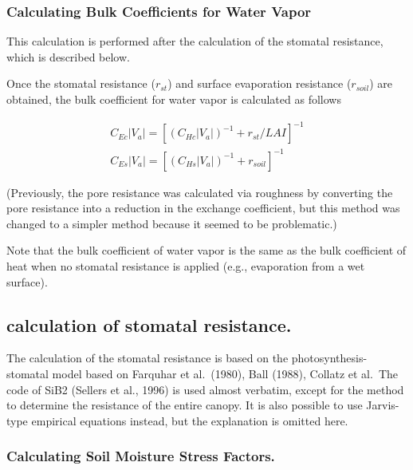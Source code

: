 \hypertarget{calculating-bulk-coefficients-for-water-vapor}{%
\subsubsection{Calculating Bulk Coefficients for Water
Vapor}\label{calculating-bulk-coefficients-for-water-vapor}}

This calculation is performed after the calculation of the stomatal
resistance, which is described below.

Once the stomatal resistance (\(r_{st}\)) and surface evaporation
resistance (\(r_{soil}\)) are obtained, the bulk coefficient for water
vapor is calculated as follows

\begin{eqnarray}
 C_{Ec} |V_a| = \left[ (C_{Hc} |V_a|)^{-1} + r_{st} / LAI\right]^{-1} \\
 C_{Es} |V_a| = \left[ (C_{Hs} |V_a|)^{-1} + r_{soil}\right]^{-1}
\end{eqnarray}

(Previously, the pore resistance was calculated via roughness by
converting the pore resistance into a reduction in the exchange
coefficient, but this method was changed to a simpler method because it
seemed to be problematic.)

Note that the bulk coefficient of water vapor is the same as the bulk
coefficient of heat when no stomatal resistance is applied (e.g.,
evaporation from a wet surface).

\hypertarget{calculation-of-stomatal-resistance.}{%
\subsection{calculation of stomatal
resistance.}\label{calculation-of-stomatal-resistance.}}

The calculation of the stomatal resistance is based on the
photosynthesis-stomatal model based on Farquhar et al.~(1980), Ball
(1988), Collatz et al.~The code of SiB2 (Sellers et al., 1996) is used
almost verbatim, except for the method to determine the resistance of
the entire canopy. It is also possible to use Jarvis-type empirical
equations instead, but the explanation is omitted here.

\hypertarget{calculating-soil-moisture-stress-factors.}{%
\subsubsection{Calculating Soil Moisture Stress
Factors.}\label{calculating-soil-moisture-stress-factors.}}

